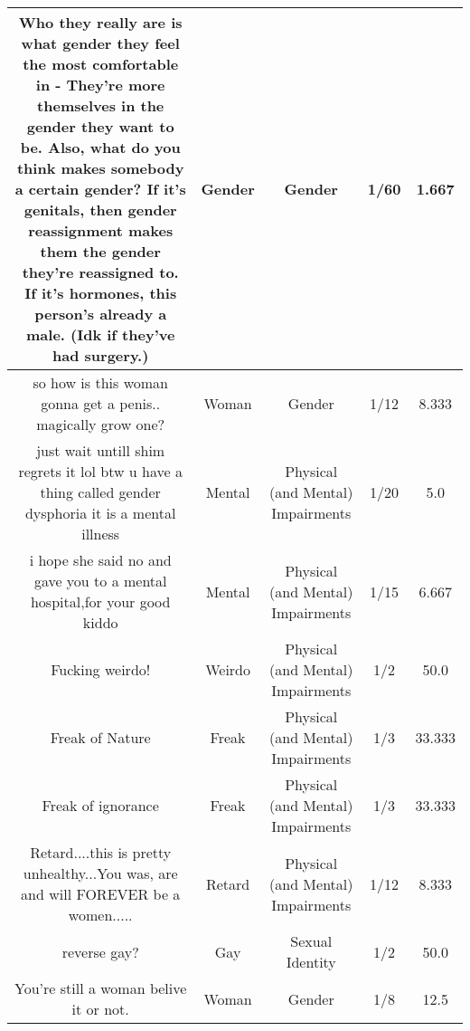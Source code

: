 \documentclass[11pt]{article}
\newlength\mylength
\begin{document}
\begin{center}
\begin{longtable}{|C{.40\mylength}|C{.30\mylength}|C{.15\mylength}|C{.15\mylength}|C{.15\mylength}|}
   Who they really are  is what gender they feel the most comfortable in - They're more themselves in the gender they want to be. Also, what do you think makes somebody a certain gender? If it's genitals, then gender reassignment makes them the gender they're reassigned to. If it's hormones, this person's already a male. (Idk if they've had surgery.)  & Gender & Gender & 1/60 & 1.667 \\  \hline
  so how is this woman gonna get a penis.. magically grow one?  & Woman & Gender & 1/12 & 8.333 \\  \hline
  just wait untill shim regrets it lol btw u have a thing called gender dysphoria  it is a mental illness   & Mental & Physical (and Mental) Impairments & 1/20 & 5.0 \\  \hline
  i hope she said no and gave you to a mental hospital,for your good kiddo  & Mental & Physical (and Mental) Impairments & 1/15 & 6.667 \\  \hline
  Fucking weirdo!  & Weirdo & Physical (and Mental) Impairments & 1/2 & 50.0 \\  \hline
  Freak of Nature  & Freak & Physical (and Mental) Impairments & 1/3 & 33.333 \\  \hline
  Freak of ignorance  & Freak & Physical (and Mental) Impairments & 1/3 & 33.333 \\  \hline
  Retard....this is pretty unhealthy...You was, are and will FOREVER  be a women.....  & Retard & Physical (and Mental) Impairments & 1/12 & 8.333 \\  \hline
  reverse gay?  & Gay & Sexual Identity & 1/2 & 50.0 \\  \hline
  You're still a woman belive it or not.  & Woman & Gender & 1/8 & 12.5 \\  \hline

\end{longtable}
\end{center}
\end{document}
